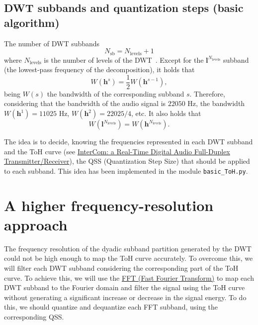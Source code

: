 \subsection{DWT subbands and quantization steps (basic algorithm)}
The number of DWT subbands
\begin{equation}
  N_{\text{sb}} = N_{\text{levels}} + 1
\end{equation}
where $N_{\text{levels}}$ is the number of levels of the
DWT~\cite{vetterli1995wavelets}. Except for the
${\mathbf l}^{N_{\text{levels}}}$ subband (the lowest-pass frequency
of the decomposition), it holds that
\begin{equation}
  W({\mathbf h}^s) = \frac{1}{2}W({\mathbf h}^{s-1}),
\end{equation}
being $W(s)$ the bandwidth of the corresponding subband
$s$. Therefore, considering that the bandwidth of the audio signal is
$22050$ Hz, the bandwidth $W({\mathbf h}^1)=11025$ Hz,
$W({\mathbf h} ^2)=22025/4$, etc. It also holds that
\begin{equation}
  W({\mathbf l}^{N_{\text{levels}}}) = W({\mathbf h}^{N_{\text{levels}}}).
\end{equation}

The idea is to decide, knowing the frequencies represented in each DWT
subband and the ToH curve (see
\href{https://github.com/Tecnologias-multimedia/InterCom/blob/master/docs/2-hours_seminar.ipynb}{
  InterCom: a Real-Time Digital Audio Full-Duplex
  Transmitter/Receiver}), the QSS (Quantization Step Size) that should
be applied to each subband. This idea has been implemented in the
module \verb|basic_ToH.py|.

\section{A higher frequency-resolution approach}
\label{sec:FFT}

The frequency resolution of the dyadic subband partition generated by
the DWT could not be high enough to map the ToH curve accurately. To
overcome this, we will filter each DWT subband considering the
corresponding part of the ToH curve. To achieve this, we will use the
\href{https://numpy.org/doc/stable/reference/routines.fft.html}{FFT
  (Fast Fourier Transform)} to map each DWT subband to the Fourier
domain and filter the signal using the ToH curve without generating a
significant increase or decrease in the signal energy. To
do this, we should quantize and dequantize each FFT subband, using the
corresponding QSS.

